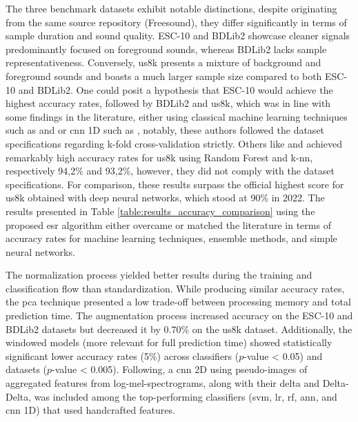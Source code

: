 The three benchmark datasets exhibit notable distinctions, despite originating from the same source repository (Freesound), they differ significantly in terms of sample duration and sound quality. ESC-10 and BDLib2 showcase cleaner signals predominantly focused on foreground sounds, whereas BDLib2 lacks sample representativeness. Conversely, \gls{us8k} presents a mixture of background and foreground sounds and boasts a much larger sample size compared to both ESC-10 and BDLib2. One could posit a hypothesis that ESC-10 would achieve the highest accuracy rates, followed by BDLib2 and \gls{us8k}, which was in line with some findings in the literature, either using classical machine learning techniques such as \textcite{Silva2019} and \textcite{Bountourakis2019} or \gls{cnn} 1D such as \textcite{Vandendriessche2021}, notably, these authors followed the dataset specifications regarding k-fold cross-validation strictly. Others like \textcite{Lhoest2021} and \textcite{Luz2021} achieved remarkably high accuracy rates for \gls{us8k} using Random Forest and \gls{k-nn}, respectively 94,2\% and 93,2\%, however, they did not comply with the dataset specifications. For comparison, these results surpass the official highest score for \gls{us8k} obtained with deep neural networks, which stood at 90\% in 2022. The results presented in Table \ref{table:results_accuracy_comparison} using the proposed \gls{esr} algorithm either overcame or matched the literature in terms of accuracy rates for machine learning techniques, ensemble methods, and simple neural networks.


The normalization process yielded better results during the training and classification flow than standardization. While producing similar accuracy rates, the \gls{pca} technique presented a low trade-off between processing memory and total prediction time. The augmentation process increased accuracy on the ESC-10 and BDLib2 datasets but decreased it by 0.70\% on the \gls{us8k} dataset. Additionally, the windowed models (more relevant for full prediction time) showed statistically significant lower accuracy rates (5\%) across classifiers ($p$-value < 0.05) and datasets ($p$-value < 0.005). Following, a \gls{cnn} 2D using pseudo-images of aggregated features from log-mel-spectrograms, along with their delta and Delta-Delta, was included among the top-performing classifiers (\gls{svm}, \gls{lr}, \gls{rf}, \gls{ann}, and \gls{cnn} 1D) that used handcrafted features.

